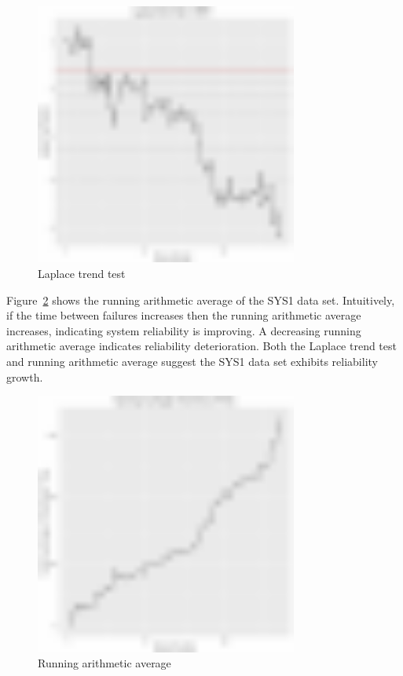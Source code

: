 \documentclass[journal]{IEEEtran}
\begin{document}
\begin{figure}[!h]
\centering
\includegraphics[width=3.4in]{Figures/SRT3}
\caption{Laplace trend test}
\label{fig_Tab1_Laplace}
\end{figure}


Figure~\ref{fig_SRT_RAT} shows the running arithmetic average of the SYS1 data set. Intuitively, if the time between failures increases then the running arithmetic average increases, indicating system reliability is improving. A decreasing running arithmetic average indicates reliability deterioration. Both the Laplace trend test and running arithmetic average suggest the SYS1 data set exhibits reliability growth.

\begin{figure}[!h]
\centering
\includegraphics[width=3.4in]{Figures/SRT_RAT}
\caption{Running arithmetic average}
\label{fig_SRT_RAT}
\end{figure}
\end{document}
